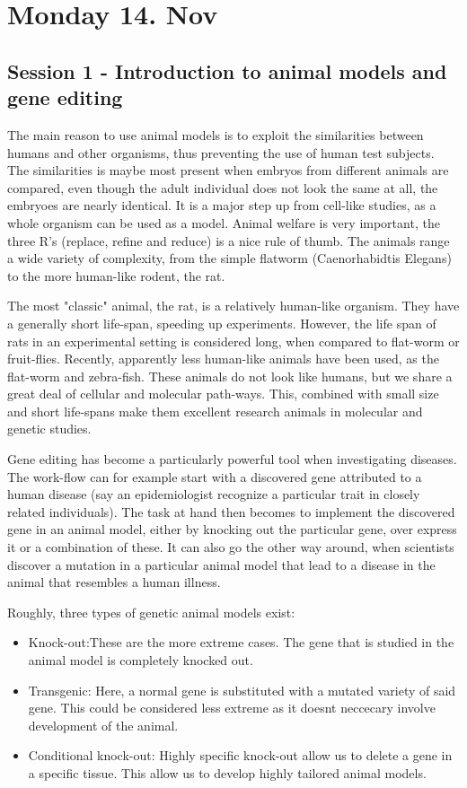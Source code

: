 \documentclass[12p]{article}
\begin{document}
\section*{Monday 14. Nov}

\subsection*{Session 1 - Introduction to animal models and gene editing}
The main reason to use animal models is to exploit the similarities between humans and other organisms, thus preventing the use of human test subjects.
The similarities is maybe most present when embryos from different animals are compared, even though the adult individual does not look the same at all, the embryoes are nearly identical.
It is a major step up from cell-like studies, as a whole organism can be used as a model.
Animal welfare is very important, the three R's (replace, refine and reduce) is a nice rule of thumb.
The animals range a wide variety of complexity, from the simple flatworm (Caenorhabidtis Elegans) to the more human-like rodent, the rat.

The most "classic" animal, the rat, is a relatively human-like organism.
They have a generally short life-span, speeding up experiments.
However, the life span of rats in an experimental setting is considered long, when compared to flat-worm or fruit-flies.
Recently, apparently less human-like animals have been used, as the flat-worm and zebra-fish.
These animals do not look like humans, but we share a great deal of cellular and molecular path-ways.
This, combined with small size and short life-spans make them excellent research animals in molecular and genetic studies.

Gene editing has become a particularly powerful tool when investigating diseases.
The work-flow can for example start with a discovered gene attributed to a human disease (say an epidemiologist recognize a particular trait in closely related individuals).
The task at hand then becomes to implement the discovered gene in an animal model, either by knocking out the particular gene, over express it or a combination of these.
It can also go the other way around, when scientists discover a mutation in a particular animal model that lead to a disease in the animal that resembles a human illness.

Roughly, three types of genetic animal models exist:

\begin{itemize}
\item
    Knock-out:These are the more extreme cases. 
    The gene that is studied in the animal model is completely knocked out.
\item
    Transgenic: Here, a normal gene is substituted with a mutated variety of said gene.
    This could be considered less extreme as it doesnt neccecary involve development of the animal.
\item
    Conditional knock-out: Highly specific knock-out allow us to delete a gene in a specific tissue.
    This allow us to develop highly tailored animal models.
\end{itemize}
\end{document}
